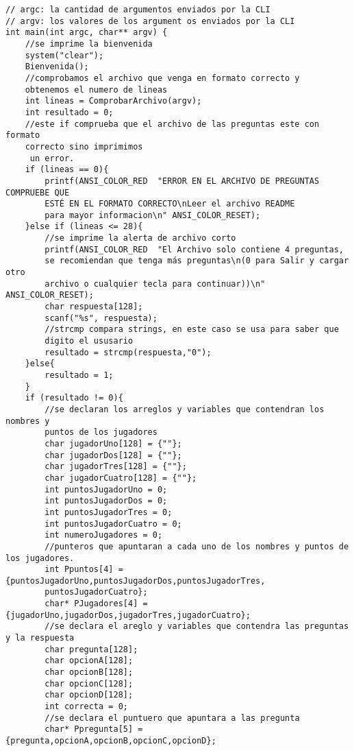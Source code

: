 \begin{verbatim}
// argc: la cantidad de argumentos enviados por la CLI
// argv: los valores de los argument os enviados por la CLI
int main(int argc, char** argv) {
    //se imprime la bienvenida
    system("clear");
    Bienvenida();
    //comprobamos el archivo que venga en formato correcto y 
    obtenemos el numero de lineas
    int lineas = ComprobarArchivo(argv);
    int resultado = 0;
    //este if comprueba que el archivo de las preguntas este con formato 
    correcto sino imprimimos
     un error.
    if (lineas == 0){
        printf(ANSI_COLOR_RED  "ERROR EN EL ARCHIVO DE PREGUNTAS COMPRUEBE QUE 
        ESTÉ EN EL FORMATO CORRECTO\nLeer el archivo README 
        para mayor informacion\n" ANSI_COLOR_RESET);
    }else if (lineas <= 28){
        //se imprime la alerta de archivo corto
        printf(ANSI_COLOR_RED  "El Archivo solo contiene 4 preguntas, 
        se recomiendan que tenga más preguntas\n(0 para Salir y cargar otro 
        archivo o cualquier tecla para continuar))\n" ANSI_COLOR_RESET);
        char respuesta[128];
        scanf("%s", respuesta);
        //strcmp compara strings, en este caso se usa para saber que 
        digito el ususario
        resultado = strcmp(respuesta,"0");
    }else{
        resultado = 1;
    }
    if (resultado != 0){
        //se declaran los arreglos y variables que contendran los nombres y 
        puntos de los jugadores
        char jugadorUno[128] = {""};
        char jugadorDos[128] = {""};
        char jugadorTres[128] = {""};
        char jugadorCuatro[128] = {""};
        int puntosJugadorUno = 0;
        int puntosJugadorDos = 0;
        int puntosJugadorTres = 0;
        int puntosJugadorCuatro = 0;
        int numeroJugadores = 0;
        //punteros que apuntaran a cada uno de los nombres y puntos de los jugadores.
        int Ppuntos[4] = {puntosJugadorUno,puntosJugadorDos,puntosJugadorTres,
        puntosJugadorCuatro};
        char* PJugadores[4] = {jugadorUno,jugadorDos,jugadorTres,jugadorCuatro};
        //se declara el areglo y variables que contendra las preguntas y la respuesta
        char pregunta[128];
        char opcionA[128];
        char opcionB[128];
        char opcionC[128];
        char opcionD[128];
        int correcta = 0;
        //se declara el puntuero que apuntara a las pregunta 
        char* Ppregunta[5] = {pregunta,opcionA,opcionB,opcionC,opcionD};


\end{verbatim}
